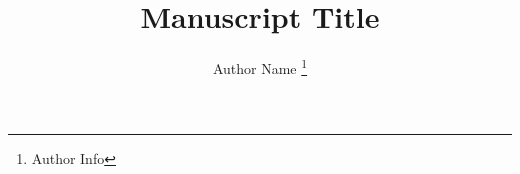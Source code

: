 \documentclass[journal]{IEEEtran}
\begin{document}
\title{\huge Manuscript Title}
\author{
	Author Name%
	\thanks{Author Info}
}

\maketitle

\begin{abstract}
	
\end{abstract}

\IEEEpeerreviewmaketitle





\end{document}
